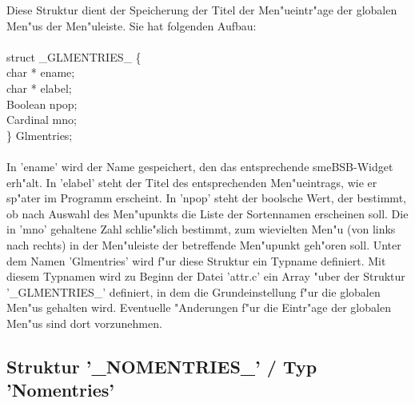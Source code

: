 Diese Struktur dient der Speicherung der Titel der Men"ueintr"age der globalen Men"us der Men"uleiste. Sie hat folgenden Aufbau:\\ 
\\
struct \_GLMENTRIES\_ \{\\
\hspace*{1em}   char *   ename;\\
\hspace*{1em}   char *   elabel;\\
\hspace*{1em}   Boolean  npop;\\
\hspace*{1em}   Cardinal mno;\\
\} Glmentries;\\
\\
In 'ename' wird der Name gespeichert, den das entsprechende smeBSB-Widget erh"alt. In 'elabel' steht der Titel des entsprechenden Men"ueintrags, wie er sp"ater im Programm erscheint. In 'npop' steht der boolsche Wert, der bestimmt, ob nach Auswahl des Men"upunkts die Liste der Sortennamen erscheinen soll. Die in 'mno' gehaltene Zahl schlie"slich bestimmt, zum wievielten Men"u (von links nach rechts) in der Men"uleiste der betreffende Men"upunkt geh"oren soll. Unter dem Namen 'Glmentries' wird f"ur diese Struktur ein Typname definiert. Mit diesem Typnamen wird zu Beginn der Datei 'attr.c' ein Array "uber der Struktur '\_GLMENTRIES\_' definiert, in dem die Grundeinstellung f"ur die globalen Men"us gehalten wird. Eventuelle "Anderungen f"ur die Eintr"age der globalen Men"us sind dort vorzunehmen.

\subsection{Struktur '\_NOMENTRIES\_' / Typ 'Nomentries'}

